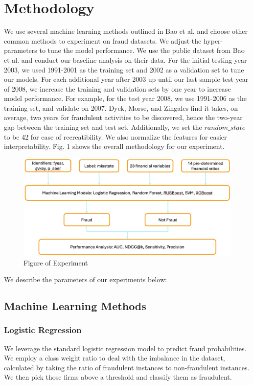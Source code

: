\documentclass[conference]{IEEEtran}
\begin{document}
\section{Methodology} We use several machine learning methods outlined in Bao et al. \cite{b7} and choose other common methods to experiment on fraud datasets. We adjust the hyper-parameters to tune the model performance. We use the public dataset from Bao et al. \cite{b7} and conduct our baseline analysis on their data. For the initial testing year 2003, we used 1991-2001 as the training set and 2002 as a validation set to tune our models. For each additional year after 2003 up until our last sample test year of 2008, we increase the training and validation sets by one year to increase model performance. For example, for the test year 2008, we use 1991-2006 as the training set, and validate on 2007. Dyck, Morse, and Zingales \cite{b4} find it takes, on average, two years for fraudulent activities to be discovered, hence the two-year gap between the training set and test set. Additionally, we set the $random\_state$ to be 42 for ease of recreatibility. We also normalize the features for easier interpretability. Fig. 1 shows the overall methodology for our experiment. \vspace{10pt} \begin{figure}[H]
\centerline{\includegraphics[width=\columnwidth]{mlmethod}}
\caption{Figure of Experiment}
\label{fig}
\end{figure}
\vspace{10pt}We describe the parameters of our experiments below:\subsection{Machine Learning Methods} 
\subsubsection{Logistic Regression} We leverage the standard logistic regression model to predict fraud probabilities. We employ a class weight ratio to deal with the imbalance in the dataset, calculated by taking the ratio of fraudulent instances to non-fraudulent instances. We then pick those firms above a threshold and classify them as fraudulent. 
\end{document}
